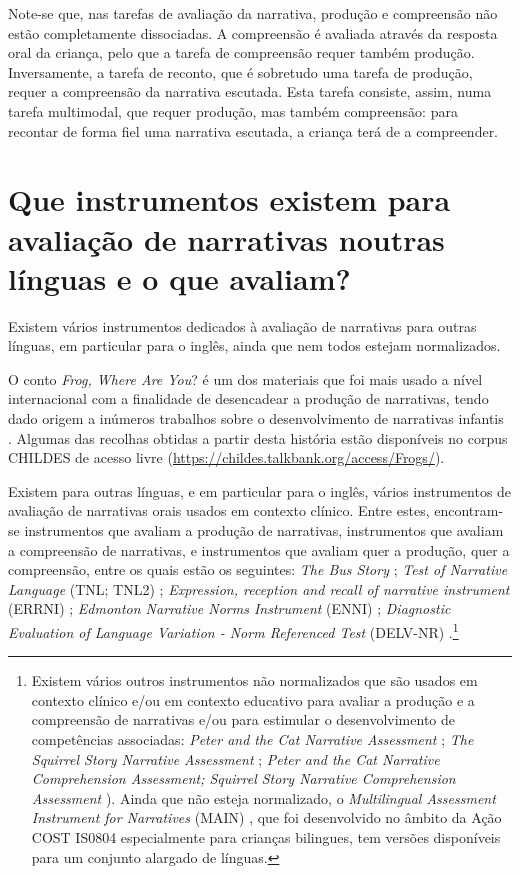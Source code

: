 \documentclass[output=paper,colorlinks,citecolor=brown,booklanguage=portuguese]{langscibook}
\begin{document}
Note-se que, nas tarefas de avaliação da narrativa, produção e compreensão não estão completamente dissociadas. A compreensão é avaliada através da resposta oral da criança, pelo que a tarefa de compreensão requer também produção. Inversamente, a tarefa de reconto, que é sobretudo uma tarefa de produção, requer a compreensão da narrativa escutada. Esta tarefa consiste, assim, numa tarefa multimodal, que requer produção, mas também compreensão: para recontar de forma fiel uma narrativa escutada, a criança terá de a compreender.

\largerpage[2]
\section{Que instrumentos existem para avaliação de narrativas noutras línguas e o que avaliam?}\label{sec:trêscap16} Existem vários instrumentos dedicados à avaliação de narrativas para outras línguas, em particular para o inglês, ainda que nem todos estejam normalizados.

O conto \emph{Frog, Where Are You}? \citep{Mayer1969} é um dos materiais que foi mais usado a nível internacional com a finalidade de desencadear a produção de narrativas, tendo dado origem a inúmeros trabalhos sobre o desenvolvimento de narrativas infantis \citep{Berman1994}. Algumas das recolhas obtidas a partir desta história estão disponíveis no corpus CHILDES de acesso livre (\url{https://childes.talkbank.org/access/Frogs/}).

Existem para outras línguas, e em particular para o inglês, vários instrumentos de avaliação de narrativas orais usados em contexto clínico. Entre estes, encon\-tram-se instrumentos que avaliam a produção de narrativas, instrumentos que avaliam a compreensão de narrativas, e instrumentos que avaliam quer a produção, quer a compreensão, entre os quais estão os seguintes: \emph{The Bus Story} \citep{Renfrew1969}; \emph{Test of Narrative Language} (TNL; TNL2) \citep{Gillam2017}; \emph{Expression, reception and recall of narrative instrument} (ERRNI) \citep{Bishop2004}; \emph{Edmonton Narrative Norms Instrument} (ENNI) \citep{Schneider2005}; \emph{Diagnostic Evaluation of Language Variation - Norm Referenced Test} (DELV-NR) \citep{Seymour2005}.\footnote{Existem vários outros instrumentos não normalizados que são usados em contexto clínico e/ou em contexto educativo para avaliar a produção e a compreensão de narrativas e/ou para estimular o desenvolvimento de competências associadas: \emph{Peter and the Cat Narrative Assessment} \citep{Leitao2003}; \emph{The Squirrel Story Narrative Assessment} \citep{Carey2006}; \emph{Peter and the Cat Narrative Comprehension Assessment; Squirrel Story Narrative Comprehension Assessment} \citep{Dawes2019}). Ainda que não esteja normalizado, o \emph{Multilingual Assessment Instrument for Narratives} (MAIN) \citep{Gagarina2015}, que foi desenvolvido no âmbito da Ação COST IS0804 especialmente para crianças bilingues, tem versões disponíveis para um conjunto alargado de línguas.}
\end{document}

